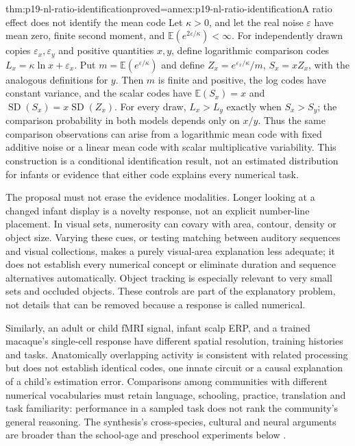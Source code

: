 \begin{hbtheorem}{thm:p19-nl-ratio-identification}{proved=annex:p19-nl-ratio-identification}{A ratio effect does not identify the mean code}
Let \(\kappa>0\), and let the real noise \(\varepsilon\) have
mean zero, finite second moment, and
\(\mathbb E(e^{2\varepsilon/\kappa})<\infty\).
For independently drawn copies \(\varepsilon_x,\varepsilon_y\)
and positive quantities \(x,y\), define logarithmic comparison
codes \(L_x=\kappa\ln x+\varepsilon_x\).
Put \(m=\mathbb E(e^{\varepsilon/\kappa})\) and define
\(Z_x=e^{\varepsilon_x/\kappa}/m\), \(S_x=xZ_x\), with
the analogous definitions for \(y\).
Then \(m\) is finite and positive, the log codes have constant
variance, and the scalar codes have
\(\mathbb E(S_x)=x\) and
\(\operatorname{SD}(S_x)=x\operatorname{SD}(Z_x)\).
For every draw, \(L_x>L_y\) exactly when \(S_x>S_y\);
the comparison probability in both models depends only on \(x/y\).
Thus the same comparison observations can arise from a logarithmic
mean code with fixed additive noise or a linear mean code with
scalar multiplicative variability. This construction is a conditional
identification result, not an estimated distribution for infants
or evidence that either code explains every numerical task.
\end{hbtheorem}

The proposal must not erase the evidence modalities. Longer looking at a
changed infant display is a novelty response, not an explicit number-line
placement. In visual sets, numerosity can covary with area, contour,
density or object size. Varying these cues, or testing matching between
auditory sequences and visual collections, makes a purely visual-area
explanation less adequate; it does not establish every numerical concept
or eliminate duration and sequence alternatives automatically.
Object tracking is especially relevant to very small sets and occluded
objects. These controls are part of the explanatory problem, not details
that can be removed because a response is called numerical.

Similarly, an adult or child fMRI signal, infant scalp ERP, and a
trained macaque's single-cell response have different spatial resolution,
training histories and tasks. Anatomically overlapping activity is
consistent with related processing but does not establish identical codes,
one innate circuit or a causal explanation of a child's estimation error.
Comparisons among communities with different numerical vocabularies must
retain language, schooling, practice, translation and task familiarity:
performance in a sampled task does not rank the community's general
reasoning. The synthesis's cross-species, cultural and neural arguments
are broader than the school-age and preschool experiments below
\cite[author draft, pp.~6--15, 23--24 and 35--38]
{OpferSiegler2012QuantitativeDraftNL}.

